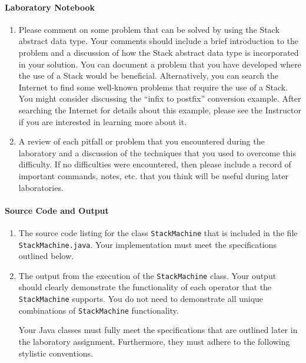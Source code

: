 \paragraph{Laboratory Notebook}

\begin{enumerate}
\item
  Please comment on some problem that can be solved by using the Stack
  abstract data type. Your comments should include a brief introduction
  to the problem and a discussion of how the Stack abstract data type is
  incorporated in your solution. You can document a problem that you
  have developed where the use of a Stack would be beneficial.
  Alternatively, you can search the Internet to find some well-known
  problems that require the use of a Stack. You might consider
  discussing the ``infix to postfix'' conversion example. After
  searching the Internet for details about this example, please see the
  Instructor if you are interested in learning more about it.
\item
  A review of each pitfall or problem that you encountered during the
  laboratory and a discussion of the techniques that you used to
  overcome this difficulty. If no difficulties were encountered, then
  please include a record of important commands, notes, etc. that you
  think will be useful during later laboratories.
\end{enumerate}

\paragraph{Source Code and Output}

\begin{enumerate}
\item
  The source code listing for the class \texttt{StackMachine} that is
  included in the file \texttt{StackMachine.java}. Your implementation
  must meet the specifications outlined below.
\item
  The output from the execution of the \texttt{StackMachine} class. Your
  output should clearly demonstrate the functionality of each operator
  that the \texttt{StackMachine} supports. You do not need to
  demonstrate all unique combinations of \texttt{StackMachine}
  functionality.

  Your Java classes must fully meet the specifications that are outlined
  later in the laboratory assignment. Furthermore, they must adhere to
  the following stylistic conventions.
\end{enumerate}

